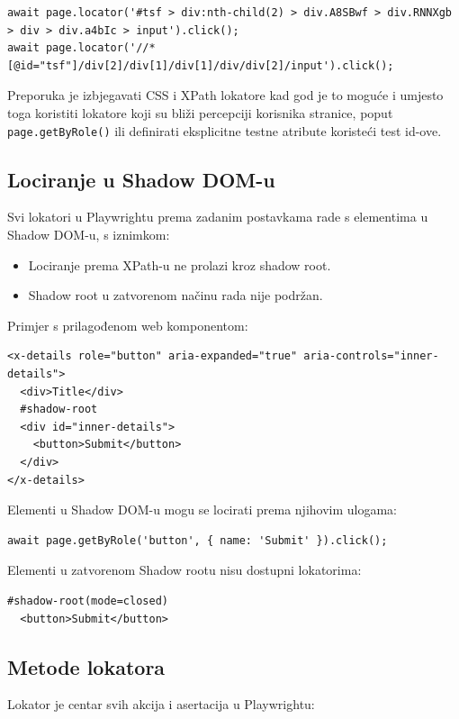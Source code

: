 \begin{verbatim}
await page.locator('#tsf > div:nth-child(2) > div.A8SBwf > div.RNNXgb > div > div.a4bIc > input').click();
await page.locator('//*[@id="tsf"]/div[2]/div[1]/div[1]/div/div[2]/input').click();
\end{verbatim}

Preporuka je izbjegavati CSS i XPath lokatore kad god je to moguće i umjesto toga koristiti lokatore koji su bliži percepciji korisnika stranice, poput \texttt{page.getByRole()} ili definirati eksplicitne testne atribute koristeći test id-ove.

\subsection*{Lociranje u Shadow DOM-u}

Svi lokatori u Playwrightu prema zadanim postavkama rade s elementima u Shadow DOM-u, s iznimkom:
\begin{itemize}
\item Lociranje prema XPath-u ne prolazi kroz shadow root.
\item Shadow root u zatvorenom načinu rada nije podržan.
\end{itemize}

Primjer s prilagođenom web komponentom:

\begin{verbatim}
<x-details role="button" aria-expanded="true" aria-controls="inner-details">
  <div>Title</div>
  #shadow-root
  <div id="inner-details">
    <button>Submit</button>
  </div>
</x-details>
\end{verbatim}

Elementi u Shadow DOM-u mogu se locirati prema njihovim ulogama:

\begin{verbatim}
await page.getByRole('button', { name: 'Submit' }).click();
\end{verbatim}

Elementi u zatvorenom Shadow rootu nisu dostupni lokatorima:

\begin{verbatim}
#shadow-root(mode=closed)
  <button>Submit</button>
\end{verbatim}

\subsection*{Metode lokatora}

Lokator je centar svih akcija i asertacija u Playwrightu:

